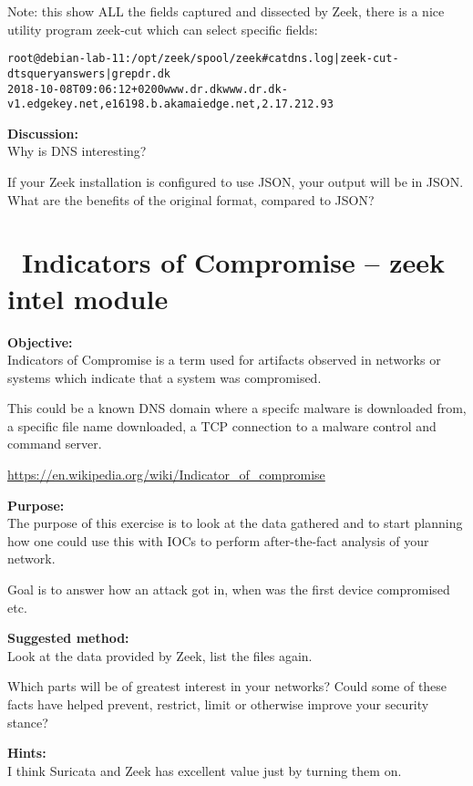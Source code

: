 \documentclass[a4paper,11pt,notitlepage]{report}
\begin{document}
Note: this show ALL the fields captured and dissected by Zeek, there is a nice utility program zeek-cut which can select specific fields:

\begin{alltt}\small
root@debian-lab-11:/opt/zeek/spool/zeek# cat dns.log | zeek-cut -d ts query answers | grep dr.dk
2018-10-08T09:06:12+0200	www.dr.dk	www.dr.dk-v1.edgekey.net,e16198.b.akamaiedge.net,2.17.212.93
\end{alltt}

{\bf Discussion:}\\
Why is DNS interesting?

If your Zeek installation is configured to use JSON, your output will be in JSON. What are the benefits of the original format, compared to JSON?



\chapter{\faInfoCircle\  Indicators of Compromise -- zeek intel module }
\label{ex:zeekioc}


{\bf Objective:} \\
Indicators of Compromise is a term used for artifacts observed in networks or systems which indicate that a system was compromised.

This could be a known DNS domain where a specifc malware is downloaded from, a specific file name downloaded, a TCP connection to a malware control and command server.

\url{https://en.wikipedia.org/wiki/Indicator_of_compromise}

{\bf Purpose:}\\
The purpose of this exercise is to look at the data gathered and to start planning how one could use this with IOCs to perform after-the-fact analysis of your network.

Goal is to answer how an attack got in, when was the first device compromised etc.


{\bf Suggested method:}\\
Look at the data provided by Zeek, list the files again.

Which parts will be of greatest interest in your networks? Could some of these facts have helped prevent, restrict, limit or otherwise improve your security stance?


{\bf Hints:}\\
I think Suricata and Zeek has excellent value just by turning them on.
\end{document}
